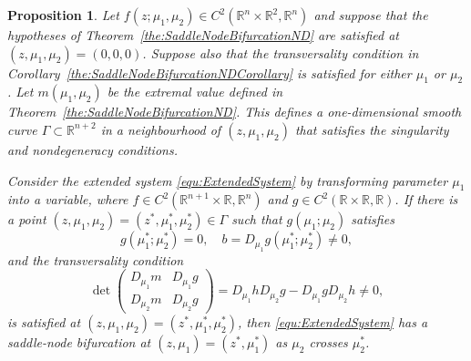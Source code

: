 \documentclass[12pt]{article}
\newtheorem{proposition}{Proposition}
\begin{document}
\begin{proposition}
    \label{the:NDCase:SaddleNodeBifurcationExtensionND}
    Let $f(z;\mu_{1},\mu_{2})\in C^{2}(\mathbb{R}^{n}\times \mathbb{R}^{2},\mathbb{R}^{n})$ and suppose that the hypotheses of Theorem~\ref{the:SaddleNodeBifurcationND} are satisfied at $(z,\mu_{1},\mu_{2})=(0,0,0)$. Suppose also that the transversality condition in Corollary~\ref{the:SaddleNodeBifurcationNDCorollary} is satisfied for either $\mu_{1}$ or $\mu_{2}$. Let $m(\mu_{1},\mu_{2})$ be the extremal value defined in Theorem~\ref{the:SaddleNodeBifurcationND}. This defines a one-dimensional smooth curve $\Gamma\subset\mathbb{R}^{n+2}$ in a neighbourhood of $(z, \mu_{1}, \mu_{2})$ that satisfies the singularity and nondegeneracy conditions.

    Consider the extended system \eqref{equ:ExtendedSystem} by transforming parameter $\mu_{1}$ into a variable, where $f\in C^{2}(\mathbb{R}^{n+1}\times\mathbb{R},\mathbb{R}^{n})$ and $g\in C^{2}(\mathbb{R}\times\mathbb{R}, \mathbb{R})$. If there is a point $(z,\mu_{1},\mu_{2})=(z^{*},\mu_{1}^{*},\mu_{2}^{*})\in\Gamma$ such that $g(\mu_{1};\mu_{2})$ satisfies
    \begin{equation}
        g(\mu_{1}^{*};\mu_{2}^{*})=0, \quad b=D_{\mu_{1}}g(\mu_{1}^{*};\mu_{2}^{*})\neq 0,
        \label{equ:Proposition3:SingularityConditions}
    \end{equation}
    and the transversality condition
    \begin{equation}
        \det\begin{pmatrix}
            D_{\mu_{1}}m & D_{\mu_{1}}g \\
            D_{\mu_{2}}m & D_{\mu_{2}}g
        \end{pmatrix} = D_{\mu_{1}}hD_{\mu_{2}}g - D_{\mu_{1}}gD_{\mu_{2}}h \neq 0,
      \label{equ:Proposition3:TransversalityCondition}
    \end{equation}
    is satisfied at $(z,\mu_{1},\mu_{2})=(z^{*},\mu_{1}^{*},\mu_{2}^{*})$, then \eqref{equ:ExtendedSystem} has a saddle-node bifurcation at $(z,\mu_{1})=(z^{*},\mu_{1}^{*})$ as $\mu_{2}$ crosses $\mu_{2}^{*}$.
\end{proposition}
\end{document}
